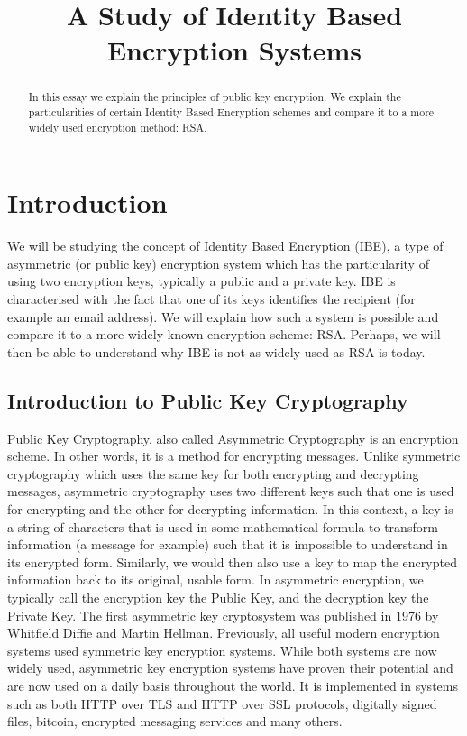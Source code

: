\documentclass[conference]{IEEEtran}
\begin{document}
\title{A Study of Identity Based Encryption Systems}

\author{
}

\maketitle
\begin{abstract}
In this essay we explain the principles of public key encryption.
We explain the particularities of certain Identity Based Encryption schemes
and compare it to a more widely used encryption method: RSA.
\end{abstract}

\section{Introduction}
We will be studying the concept of Identity Based Encryption (IBE),
a type of asymmetric (or public key) encryption system which has the 
particularity of using two encryption keys, typically a public and a private key.
IBE is characterised with the fact that one of its keys identifies the recipient
(for example an email address). We will explain how such a system is possible
and compare it to a more widely known encryption scheme: RSA. Perhaps, we will
then be able to understand why IBE is not as widely used as RSA is today. 

\subsection{Introduction to Public Key Cryptography}
Public Key Cryptography, also called Asymmetric Cryptography is an 
encryption scheme. In other words, it is a method for encrypting messages.
Unlike symmetric cryptography which uses the same key for both encrypting and decrypting
messages, asymmetric cryptography uses two different keys such that one 
is used for encrypting and the other for decrypting information.
In this context, a key is a string of characters that is used in some mathematical
formula to transform information (a message for example) such that it is impossible to understand in its encrypted form. 
Similarly, we would then also use a key to map the encrypted information back to its original, usable form.
In asymmetric encryption, we typically call the encryption key
the Public Key, and the decryption key the Private Key.
The first asymmetric key cryptosystem was published in 1976 by Whitfield Diffie and Martin Hellman.
Previously, all useful modern encryption systems used symmetric key encryption systems. 
While both systems are now widely used, asymmetric key encryption systems 
have proven their potential and are now used on a daily basis throughout the world. It is implemented 
in systems such as both HTTP over TLS and HTTP over SSL protocols, digitally signed files, bitcoin,
encrypted messaging services and many others. 
\end{document}
